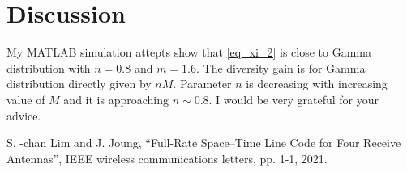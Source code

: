 \documentclass{article}
\begin{document}
\section{Discussion}

My MATLAB simulation attepts show that \eqref{eq_xi_2} is close to Gamma distribution with $n = 0.8$ and $m = 1.6$. The diversity gain is for Gamma distribution directly given by $nM$. Parameter $n$ is decreasing with increasing value of $M$ and it is approaching $n \sim 0.8$.   
I would be very grateful for your advice.


\begin{thebibliography}{00}

 S. -chan Lim and J. Joung, “Full-Rate Space–Time Line Code for Four Receive Antennas”, IEEE wireless communications letters, pp. 1-1, 2021.

\end{thebibliography}
\end{document}

